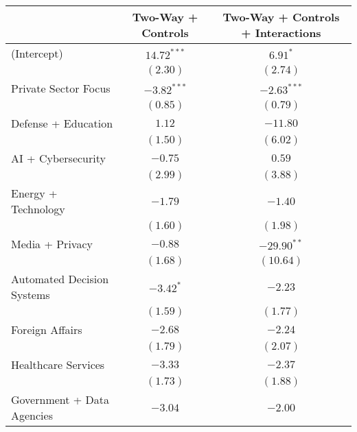 
\begin{table}
\begin{center}
\begin{tabular}{l c c}
\hline
 & Two-Way + Controls & Two-Way + Controls + Interactions \\
\hline
(Intercept)                                       & $14.72^{***}$ & $6.91^{*}$    \\
                                                  & $(2.30)$      & $(2.74)$      \\
Private Sector Focus                            & $-3.82^{***}$ & $-2.63^{***}$ \\
                                                  & $(0.85)$      & $(0.79)$      \\
Defense + Education                             & $1.12$        & $-11.80$      \\
                                                  & $(1.50)$      & $(6.02)$      \\
AI + Cybersecurity                              & $-0.75$       & $0.59$        \\
                                                  & $(2.99)$      & $(3.88)$      \\
Energy + Technology                             & $-1.79$       & $-1.40$       \\
                                                  & $(1.60)$      & $(1.98)$      \\
Media + Privacy                                 & $-0.88$       & $-29.90^{**}$ \\
                                                  & $(1.68)$      & $(10.64)$     \\
Automated Decision Systems                      & $-3.42^{*}$   & $-2.23$       \\
                                                  & $(1.59)$      & $(1.77)$      \\
Foreign Affairs                                 & $-2.68$       & $-2.24$       \\
                                                  & $(1.79)$      & $(2.07)$      \\
Healthcare Services                             & $-3.33$       & $-2.37$       \\
                                                  & $(1.73)$      & $(1.88)$      \\
Government + Data Agencies                      & $-3.04$       & $-2.00$       \\

\end{tabular}
\end{center}
\end{table}

